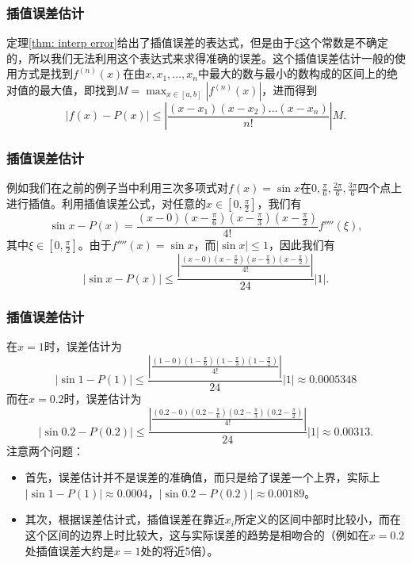 \documentclass[10pt]{beamer}
\begin{document}
\begin{frame}
\frametitle{插值误差估计}
定理\ref{thm: interp error}给出了插值误差的表达式，但是由于$\xi$这个常数是不确定的，所以我们无法利用这个表达式来求得准确的误差。这个插值误差估计一般的使用方式是找到$f^{(n)}(x)$在由$x, x_1, \ldots, x_n$中最大的数与最小的数构成的区间上的绝对值的最大值，即找到$M = \max_{x \in [a,b]} |f^{(n)}(x)|$，进而得到
\begin{equation}
|f(x) - P(x)| \le |\frac{(x - x_1)(x - x_2) \ldots (x-x_n)}{n!}|M.
\end{equation}
\end{frame}


\begin{frame}
\frametitle{插值误差估计}
例如我们在之前的例子当中利用三次多项式对$f(x) = \sin x$在$0, \frac{\pi}{6}, \frac{2\pi}{6}, \frac{3\pi}{6}$四个点上进行插值。利用插值误差公式，对任意的$x \in [0, \frac{\pi}{2}]$，我们有
\begin{equation}
\sin x - P(x) = \frac{(x-0)(x- \frac{\pi}{6})(x-\frac{\pi}{3})(x- \frac{\pi}{2})}{4!}f''''(\xi),
\end{equation}
其中$\xi \in [0,  \frac{\pi}{2}]$。由于$f''''(x) = \sin x$，而$|\sin x| \le 1$，因此我们有
\begin{equation}
|\sin x - P(x)| \le \frac{|\frac{(x-0)(x- \frac{\pi}{6})(x-\frac{\pi}{3})(x- \frac{\pi}{2})}{4!}|}{24} |1|.
\end{equation}
\end{frame}


\begin{frame}
\frametitle{插值误差估计}
在$x =1$时，误差估计为
\begin{equation}
| \sin 1 - P(1) | \le \frac{|\frac{(1-0)(1- \frac{\pi}{6})(1-\frac{\pi}{3})(1- \frac{\pi}{2})}{4!}|}{24} |1| \approx 0.0005348
\end{equation}
而在$x = 0.2$时，误差估计为
\begin{equation}
| \sin 0.2 - P(0.2) | \le \frac{|\frac{(0.2-0)(0.2- \frac{\pi}{6})(0.2-\frac{\pi}{3})(0.2- \frac{\pi}{2})}{4!}|}{24} |1| \approx 0.00313.
\end{equation}
注意两个问题：
\begin{itemize}
\item 首先，误差估计并不是误差的准确值，而只是给了误差一个上界，实际上$| \sin 1 - P(1) | \approx 0.0004$，$| \sin 0.2 - P(0.2) | \approx 0.00189$。
\item 其次，根据误差估计式，插值误差在靠近$x_i$所定义的区间中部时比较小，而在这个区间的边界上时比较大，这与实际误差的趋势是相吻合的（例如在$x =0.2$处插值误差大约是$x =1$处的将近5倍）。
\end{itemize}
\end{frame}
\end{document}
